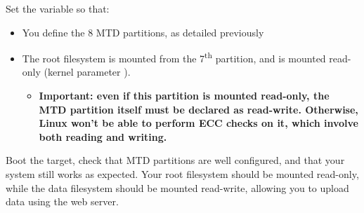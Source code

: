 Set the  variable so that:

\begin{itemize}
\item You define the 8 MTD partitions, as detailed previously
\item The root filesystem is mounted from the 7\textsuperscript{th}
  partition, and is mounted read-only (kernel parameter
  ).
  \begin{itemize}
  \item \bf{Important: even if this partition is mounted read-only,
      the MTD partition itself must be declared as read-write.
      Otherwise, Linux won't be able to perform ECC checks on it,
      which involve both reading and writing.}
  \end{itemize}
\end{itemize}

Boot the target, check that MTD partitions are well configured, and
that your system still works as expected. Your root filesystem should
be mounted read-only, while the data filesystem should be mounted
read-write, allowing you to upload data using the web server.

